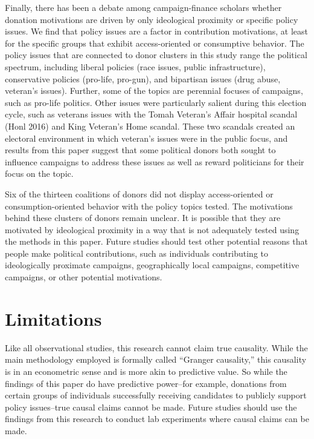 \documentclass[12pt,]{article}
\begin{document}
Finally, there has been a debate among campaign-finance scholars whether
donation motivations are driven by only ideological proximity or
specific policy issues. We find that policy issues are a factor in
contribution motivations, at least for the specific groups that exhibit
access-oriented or consumptive behavior. The policy issues that are
connected to donor clusters in this study range the political spectrum,
including liberal policies (race issues, public infrastructure),
conservative policies (pro-life, pro-gun), and bipartisan issues (drug
abuse, veteran's issues). Further, some of the topics are perennial
focuses of campaigns, such as pro-life politics. Other issues were
particularly salient during this election cycle, such as veterans issues
with the Tomah Veteran's Affair hospital scandal (Honl 2016) and King
Veteran's Home scandal. These two scandals created an electoral
environment in which veteran's issues were in the public focus, and
results from this paper suggest that some political donors both sought
to influence campaigns to address these issues as well as reward
politicians for their focus on the topic.

Six of the thirteen coalitions of donors did not display access-oriented
or consumption-oriented behavior with the policy topics tested. The
motivations behind these clusters of donors remain unclear. It is
possible that they are motivated by ideological proximity in a way that
is not adequately tested using the methods in this paper. Future studies
should test other potential reasons that people make political
contributions, such as individuals contributing to ideologically
proximate campaigns, geographically local campaigns, competitive
campaigns, or other potential motivations.

\hypertarget{limitations}{%
\section{Limitations}\label{limitations}}

Like all observational studies, this research cannot claim true
causality. While the main methodology employed is formally called
``Granger causality,'' this causality is in an econometric sense and is
more akin to predictive value. So while the findings of this paper do
have predictive power--for example, donations from certain groups of
individuals successfully receiving candidates to publicly support policy
issues--true causal claims cannot be made. Future studies should use the
findings from this research to conduct lab experiments where causal
claims can be made.
\end{document}
